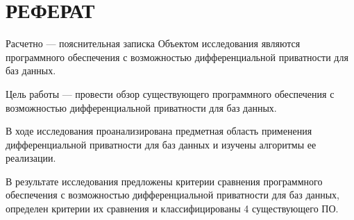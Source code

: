 \chapter*{РЕФЕРАТ}
Расчетно --- пояснительная записка 
Объектом исследования являются программного обеспечения с возможностью
дифференциальной приватности для баз данных.

Цель работы --- провести обзор существующего программного обеспечения с возможностью
дифференциальной приватности для баз данных.

В ходе исследования проанализирована предметная область применения дифференциальной приватности для баз данных и изучены алгоритмы ее реализации.

В результате исследования предложены критерии сравнения программного обеспечения с возможностью дифференциальной приватности для баз данных, определен критерии их сравнения и классифицированы 4 существующего ПО.